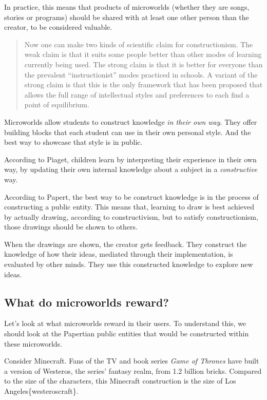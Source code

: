 In practice, this means that products of microworlds (whether they are
songs, stories or programs) should be shared with at least one other
person than the creator, to be considered valuable.

\begin{quote}
Now one can make two kinds of scientific claim for constructionism. The
weak claim is that it suits some people better than other modes of
learning currently being used. The strong claim is that it is better for
everyone than the prevalent ``instructionist'' modes practiced in
schools. A variant of the strong claim is that this is the only
framework that has been proposed that allows the full range of
intellectual styles and preferences to each find a point of equilibrium.
\end{quote}

Microworlds allow students to construct knowledge \emph{in their own
way}. They offer building blocks that each student can use in their own
personal style. And the best way to showcase that style is in public.

According to Piaget, children learn by interpreting their experience in
their own way, by updating their own internal knowledge about a subject
in a \emph{constructive} way.

According to Papert, the best way to be construct knowledge is in the
process of constructing a public entity. This means that, learning to
draw is best achieved by actually drawing, according to constructivism,
but to satisfy constructionism, those drawings should be shown to
others.

When the drawings are shown, the creator gets feedback. They construct
the knowledge of how their ideas, mediated through their implementation,
is evaluated by other minds. They use this constructed knowledge to
explore new ideas.

\subsection{What do microworlds reward?}

Let's look at what microworlds reward in their users. To understand
this, we should look at the Papertian public entities that would be
constructed within these microworlds.

Consider Minecraft. Fans of the TV and book series \emph{Game of
Thrones} have built a version of Westeros, the series' fantasy realm,
from 1.2 billion bricks. Compared to the size of the characters, this
Minecraft construction is the size of Los Angeles\{westeroscraft\}.

